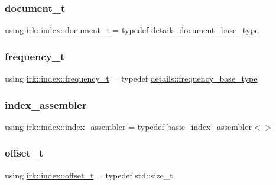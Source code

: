 \subsubsection{\texorpdfstring{document\+\_\+t}{document\_t}}
{\footnotesize\ttfamily using \mbox{\hyperlink{namespaceirk_1_1index_af829dedea20da89f9b51b49d78f57006}{irk\+::index\+::document\+\_\+t}} = typedef \mbox{\hyperlink{namespaceirk_1_1index_1_1details_a2a13af82c5a304ec713fb875d59a5603}{details\+::document\+\_\+base\+\_\+type}}}

\mbox{\label{namespaceirk_1_1index_aa2cb48e79abd95deb25bbdf36c0ea70f}} 
\subsubsection{\texorpdfstring{frequency\+\_\+t}{frequency\_t}}
{\footnotesize\ttfamily using \mbox{\hyperlink{namespaceirk_1_1index_aa2cb48e79abd95deb25bbdf36c0ea70f}{irk\+::index\+::frequency\+\_\+t}} = typedef \mbox{\hyperlink{namespaceirk_1_1index_1_1details_a4b657cb7a568be2f216aeb3eaff9e71b}{details\+::frequency\+\_\+base\+\_\+type}}}

\mbox{\label{namespaceirk_1_1index_af5df1bc3bb4579697ad99f238faace60}} 
\subsubsection{\texorpdfstring{index\+\_\+assembler}{index\_assembler}}
{\footnotesize\ttfamily using \mbox{\hyperlink{namespaceirk_1_1index_af5df1bc3bb4579697ad99f238faace60}{irk\+::index\+::index\+\_\+assembler}} = typedef \mbox{\hyperlink{classirk_1_1index_1_1basic__index__assembler}{basic\+\_\+index\+\_\+assembler}}$<$$>$}

\mbox{\label{namespaceirk_1_1index_ad66c0e72549ffc6b78a85158293bb47b}} 
\subsubsection{\texorpdfstring{offset\+\_\+t}{offset\_t}}
{\footnotesize\ttfamily using \mbox{\hyperlink{namespaceirk_1_1index_ad66c0e72549ffc6b78a85158293bb47b}{irk\+::index\+::offset\+\_\+t}} = typedef std\+::size\+\_\+t}

